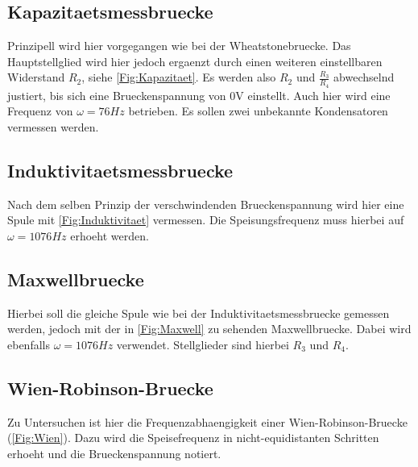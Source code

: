 \subsection{Kapazitaetsmessbruecke}
Prinzipell wird hier vorgegangen wie bei der Wheatstonebruecke. Das Hauptstellglied wird hier jedoch ergaenzt durch einen weiteren einstellbaren Widerstand $R_2$, siehe \ref{Fig:Kapazitaet}. Es werden also $R_2$ und $\frac{R_3}{R_4}$ abwechselnd justiert, bis sich eine Brueckenspannung von 0V einstellt. Auch hier wird eine Frequenz von $\omega=76Hz$ betrieben. Es sollen zwei unbekannte Kondensatoren vermessen werden. 
\subsection{Induktivitaetsmessbruecke}
Nach dem selben Prinzip der verschwindenden Brueckenspannung wird hier eine Spule mit \ref{Fig:Induktivitaet} vermessen. Die Speisungsfrequenz muss hierbei auf $\omega=1076Hz$ erhoeht werden.
\subsection{Maxwellbruecke}
Hierbei soll die gleiche Spule wie bei der Induktivitaetsmessbruecke gemessen werden, jedoch mit der in \ref{Fig:Maxwell} zu sehenden Maxwellbruecke. Dabei wird ebenfalls $\omega=1076Hz$ verwendet. Stellglieder sind hierbei $R_3$ und $R_4$.
\subsection{Wien-Robinson-Bruecke}
Zu Untersuchen ist hier die Frequenzabhaengigkeit einer Wien-Robinson-Bruecke (\ref{Fig:Wien}). Dazu wird die Speisefrequenz in nicht-equidistanten Schritten erhoeht und die Brueckenspannung notiert. 